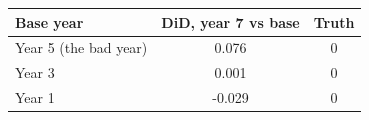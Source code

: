 \begin{tabular}{lcc}\toprule
Base year & DiD, year 7 vs base & Truth \\ \midrule
Year 5 (the bad year) & 0.076 & 0 \\
Year 3 & 0.001 & 0 \\
Year 1 & -0.029 & 0 \\
\bottomrule\end{tabular}

